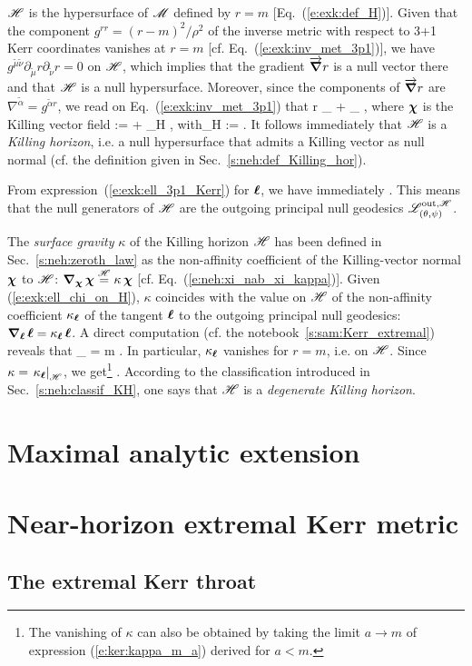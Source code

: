 $\mathscr{H}$ is the hypersurface of $\mathscr{M}$ defined by $r=m$ [Eq.~(\ref{e:exk:def_H})]. Given
that the component $g^{rr} = (r - m)^2/\rho^2$ of the inverse metric with respect to 3+1 Kerr coordinates vanishes at $r=m$ [cf. Eq.~(\ref{e:exk:inv_met_3p1})], we have
$g^{\tilde{\mu}\tilde{\nu}} \partial_{\tilde{\mu}} r \partial_{\tilde{\nu}} r = 0$ on $\mathscr{H}$,
which implies that the gradient $\overrightarrow{\bm{\nabla}} r$
is a null vector there and that $\mathscr{H}$ is a null hypersurface.
Moreover, since the components of $\overrightarrow{\bm{\nabla}} r$ are $\nabla^{\tilde{\alpha}} = g^{\tilde{\alpha}r}$,
we read on Eq.~(\ref{e:exk:inv_met_3p1}) that
\be
    \vw{\nabla} r \equalH {} \wpar_{\ti} +  \wpar_{\tph}
        \equalH {} \w{\chi} ,
\ee
where $\bm{\chi}$ is the Killing vector field
\be
    \w{\chi} := \w{\xi} + \Omega_H \w{\eta} , \qquad\mbox{with}\quad \Omega_H :=  .
\ee
It follows immediately that $\mathscr{H}$ is a \emph{Killing horizon}, i.e. a null hypersurface
that admits a Killing vector as null normal (cf. the definition given in
Sec.~\ref{s:neh:def_Killing_hor}).

From expression~(\ref{e:exk:ell_3p1_Kerr}) for $\bm{\ell}$, we have immediately
\be \label{e:exk:ell_chi_on_H}
    \wl \equalH \w{\chi} .
\ee
This means that the null generators of $\mathscr{H}$ are the outgoing principal null
geodesics $\mathscr{L}^{{\rm out},\mathscr{H}}_{(\theta,\psi)}$.

The \emph{surface gravity} $\kappa$ of the Killing horizon $\mathscr{H}$
has been defined in Sec.~\ref{s:neh:zeroth_law} as the non-affinity coefficient of the Killing-vector normal $\bm{\chi}$ to $\mathscr{H}$:
$\bm{\nabla}_{\bm{\chi}}\, \bm{\chi} \stackrel{\mathscr{H}}{=} \kappa \, \bm{\chi}$ [cf. Eq.~(\ref{e:neh:xi_nab_xi_kappa})].
Given (\ref{e:exk:ell_chi_on_H}), $\kappa$ coincides with the value on $\mathscr{H}$ of the
non-affinity coefficient $\kappa_{\bm{\ell}}$ of the tangent $\bm{\ell}$ to the outgoing principal null
geodesics: $\bm{\nabla}_{\bm{\ell}}\, \bm{\ell} = \kappa_{\bm{\ell}}\, \bm{\ell}$. A direct computation (cf. the notebook~\ref{s:sam:Kerr_extremal}) reveals that
\be
    \kappa_{\wl} = m  .
\ee
In particular, $\kappa_{\bm{\ell}}$ vanishes for $r=m$, i.e. on $\mathscr{H}$.
Since $\kappa = \left. \kappa_{\bm{\ell}} \right| _{\mathscr{H}}$, we
get\footnote{The vanishing of $\kappa$ can also be obtained
by taking the limit $a\to m$ of expression (\ref{e:ker:kappa_m_a}) derived for $a<m$.}
\be
     .
\ee
According to the classification introduced in Sec.~\ref{s:neh:classif_KH}, one says
that $\mathscr{H}$ is a \emph{degenerate Killing horizon}.


\section{Maximal analytic extension}

\section{Near-horizon extremal Kerr metric}

\subsection{The extremal Kerr throat}


